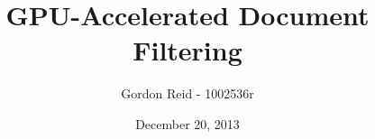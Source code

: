 \documentclass[11pt]{article}
\begin{document}
\title{GPU-Accelerated Document Filtering}
\author{Gordon Reid - 1002536r}
\date{December 20, 2013}
\maketitle
\end{document}
